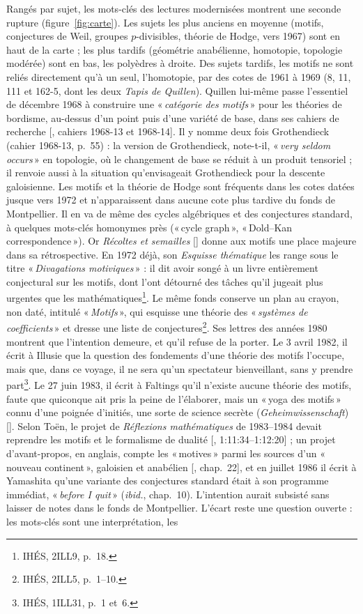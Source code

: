 \documentclass[11pt]{amsart}
\newcommand{\ts}[1]{\foreignlanguage{english}{#1}}
\newcommand{\q}[1]{«\,\textit{#1}\,»}
\newcommand{\mot}[1]{«\,#1\,»}
\begin{document}
Rangés par sujet, les mots-clés des lectures modernisées montrent une seconde rupture (figure~\ref{fig:carte}). Les sujets les plus anciens en moyenne (motifs, conjectures de Weil, groupes $p$-divisibles, théorie de Hodge, vers 1967) sont en haut de la carte ; les plus tardifs (géométrie anabélienne, homotopie, topologie modérée) sont en bas, les polyèdres à droite. Des sujets tardifs, les motifs ne sont reliés directement qu'à un seul, l'homotopie, par des cotes de 1961 à 1969 (8, 11, 111 et 162-5, dont les deux \emph{Tapis de Quillen}). Quillen lui-même passe l'essentiel de décembre 1968 à construire une \q{catégorie des motifs} pour les théories de bordisme, au-dessus d'un point puis d'une variété de base, dans ses cahiers de recherche [\citealp{quillennotebooks}, cahiers 1968-13 et 1968-14]. Il y nomme deux fois Grothendieck (cahier 1968-13, p.~55) : la version de Grothendieck, note-t-il, \q{very seldom occurs} en topologie, où le changement de base se réduit à un produit tensoriel ; il renvoie aussi à la situation qu'envisageait Grothendieck pour la descente galoisienne. Les motifs et la théorie de Hodge sont fréquents dans les cotes datées jusque vers 1972 et n'apparaissent dans aucune cote plus tardive du fonds de Montpellier. Il en va de même des cycles algébriques et des conjectures standard, à quelques mots-clés homonymes près (\mot{cycle graph}, \mot{Dold--Kan correspondence}). Or \emph{Récoltes et semailles} [\citealp{grothendieck2022}] donne aux motifs une place majeure dans sa rétrospective. En 1972 déjà, son \emph{Esquisse thématique} les range sous le titre \q{Divagations motiviques} : il dit avoir songé à un livre entièrement conjectural sur les motifs, dont l'ont détourné des tâches qu'il jugeait plus urgentes que les mathématiques\footnote{IHÉS, 2ILL9, p.~18.}. Le même fonds conserve un plan au crayon, non daté, intitulé \q{Motifs}, qui esquisse une théorie des \q{systèmes de coefficients} et dresse une liste de conjectures\footnote{IHÉS, 2ILL5, p.~1--10.}. Ses lettres des années 1980 montrent que l'intention demeure, et qu'il refuse de la porter. Le 3 avril 1982, il écrit à Illusie que la question des fondements d'une théorie des motifs l'occupe, mais que, dans ce voyage, il ne sera qu'un spectateur bienveillant, sans y prendre part\footnote{IHÉS, 1ILL31, p.~1 et~6.}. Le 27 juin 1983, il écrit à Faltings qu'il n'existe aucune théorie des motifs, faute que quiconque ait pris la peine de l'élaborer, mais un \mot{yoga des motifs} connu d'une poignée d'initiés, une sorte de science secrète (\textit{Geheimwissenschaft}) [\citealp{grothendieck1997b}]. Selon Toën, le projet de \emph{Réflexions mathématiques} de 1983--1984 devait reprendre les motifs et le formalisme de dualité [\citealp{toen2025}, \ts{1:11:34--1:12:20}] ; un projet d'avant-propos, en anglais, compte les \mot{\foreignlanguage{english}{motives}} parmi les sources d'un \mot{nouveau continent}, galoisien et anabélien [\citealp{circle-spirit}, chap.~22], et en juillet 1986 il écrit à Yamashita qu'une variante des conjectures standard était à son programme immédiat, \q{\foreignlanguage{english}{before I quit}} (\emph{ibid.}, chap.~10). L'intention aurait subsisté sans laisser de notes dans le fonds de Montpellier. L'écart reste une question ouverte : les mots-clés sont une interprétation, les 
\end{document}
